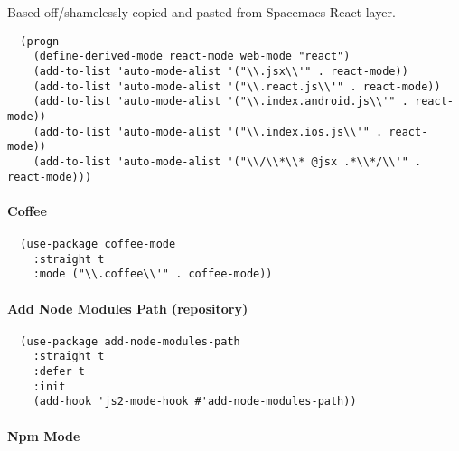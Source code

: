 \documentclass[11pt]{article}
\begin{document}
Based off/shamelessly copied and pasted from Spacemacs
React layer.

\begin{verbatim}
  (progn
    (define-derived-mode react-mode web-mode "react")
    (add-to-list 'auto-mode-alist '("\\.jsx\\'" . react-mode))
    (add-to-list 'auto-mode-alist '("\\.react.js\\'" . react-mode))
    (add-to-list 'auto-mode-alist '("\\.index.android.js\\'" . react-mode))
    (add-to-list 'auto-mode-alist '("\\.index.ios.js\\'" . react-mode))
    (add-to-list 'auto-mode-alist '("\\/\\*\\* @jsx .*\\*/\\'" . react-mode)))
\end{verbatim}

\paragraph*{Coffee}
\label{sec:org328eb87}

\begin{verbatim}
  (use-package coffee-mode
    :straight t
    :mode ("\\.coffee\\'" . coffee-mode))
\end{verbatim}

\paragraph*{Add Node Modules Path (\href{https://github.com/codesuki/add-node-modules-path}{repository})}
\label{sec:org8c85111}

\begin{verbatim}
  (use-package add-node-modules-path
    :straight t
    :defer t
    :init
    (add-hook 'js2-mode-hook #'add-node-modules-path))
\end{verbatim}

\paragraph*{Npm Mode}
\label{sec:org7d72b2b}
\end{document}
